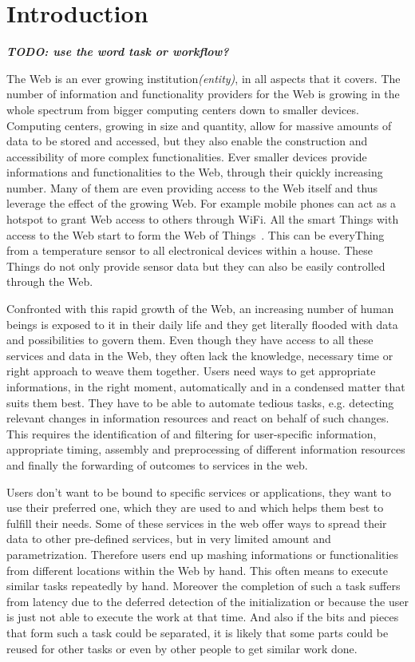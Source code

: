 
\chapter{Introduction}

\textit{\textbf{TODO: use the word task or workflow?}}

The Web is an ever growing institution\textit{(entity)}, in all aspects that it covers.
The number of information and functionality providers for the Web is growing in the whole spectrum from bigger computing centers down to smaller devices.
Computing centers, growing in size and quantity, allow for massive amounts of data to be stored and accessed, but they also enable the construction and accessibility of more complex functionalities.
Ever smaller devices provide informations and functionalities to the Web, through their quickly increasing number.
Many of them are even providing access to the Web itself and thus leverage the effect of the growing Web.
For example mobile phones can act as a hotspot to grant Web access to others through \textrm{WiFi}.
All the smart \textrm{Things} with access to the Web start to form the \textrm{Web of Things}~\cite{Guinard2011WoT}.
This can be every\textrm{Thing} from a temperature sensor to all electronical devices within a house.
These \textrm{Things} do not only provide sensor data but they can also be easily controlled through the Web.

Confronted with this rapid growth of the Web, an increasing number of human beings is exposed to it in their daily life and they get literally flooded with data and possibilities to govern them.
Even though they have access to all these services and data in the Web, they often lack the knowledge, necessary time or right approach to weave them together.
Users need ways to get appropriate informations, in the right moment, automatically and in a condensed matter that suits them best.
They have to be able to automate tedious tasks, e.g. detecting relevant changes in information resources and react on behalf of such changes.
This requires the identification of and filtering for user-specific information, appropriate timing, assembly and preprocessing of different information resources and finally the forwarding of outcomes to services in the web. 

Users don't want to be bound to specific services or applications, they want to use their preferred one, which they are used to and which helps them best to fulfill their needs.
Some of these services in the web offer ways to spread their data to other pre-defined services, but in very limited amount and parametrization.
Therefore users end up mashing informations or functionalities from different locations within the Web by hand.
This often means to execute similar tasks repeatedly by hand.
Moreover the completion of such a task suffers from latency due to the deferred detection of the initialization or because the user is just not able to execute the work at that time.
And also if the bits and pieces that form such a task could be separated, it is likely that some parts could be reused for other tasks or even by other people to get similar work done.

